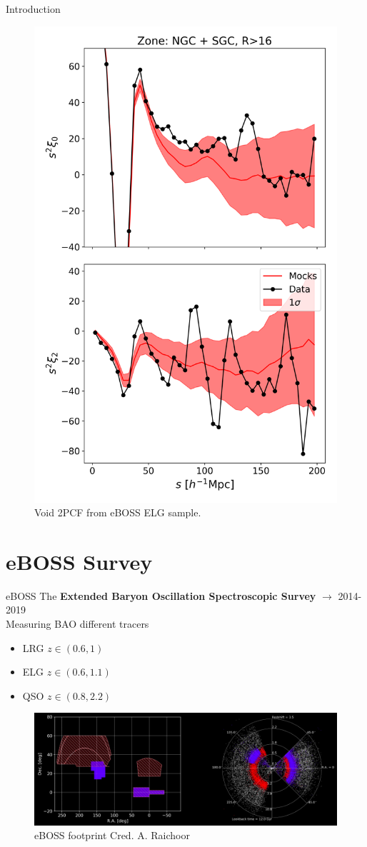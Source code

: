 \documentclass{beamer}
\begin{document}
\begin{frame}[allowframebreaks]{Introduction}
\begin{multicols}{2}
\begin{figure}
	\includegraphics[width=0.7\linewidth]{plots/void_CBZ}
	\caption{Void 2PCF from eBOSS ELG sample.}
	\label{fig:voidcbz}
\end{figure}	
\end{multicols}


\end{frame}
\section{eBOSS Survey}
\begin{frame}[allowframebreaks]{eBOSS}
	The \textbf{Extended Baryon Oscillation Spectroscopic Survey} $\rightarrow$ 2014-2019\\
	Measuring BAO different tracers
	\begin{itemize}
		\item LRG $z\in(0.6, 1)$
		\item ELG  $z\in(0.6, 1.1)$ 
		\item QSO $z\in(0.8, 2.2)$
	\end{itemize}
\begin{figure}
	\centering
	\includegraphics[width=0.7\linewidth]{plots/ebossfootp}
	\caption{eBOSS footprint \small Cred. A. Raichoor \normalsize}
	\label{fig:ebossfootp}
\end{figure}

\end{frame}
\end{document}
